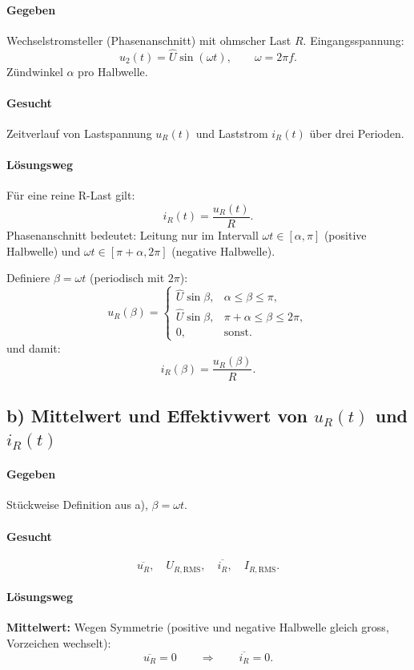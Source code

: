 \paragraph{Gegeben}
Wechselstromsteller (Phasenanschnitt) mit ohmscher Last $R$.
Eingangsspannung:
\[
u_2(t)=\hat U \sin(\omega t),\qquad \omega=2\pi f.
\]
Zündwinkel $\alpha$ pro Halbwelle.

\paragraph{Gesucht}
Zeitverlauf von Lastspannung $u_R(t)$ und Laststrom $i_R(t)$ über drei Perioden.

\paragraph{Lösungsweg}
Für eine reine R-Last gilt:
\[
i_R(t)=\frac{u_R(t)}{R}.
\]
Phasenanschnitt bedeutet: Leitung nur im Intervall $\omega t\in[\alpha,\pi]$ (positive Halbwelle)
und $\omega t\in[\pi+\alpha,2\pi]$ (negative Halbwelle).

Definiere $\beta=\omega t$ (periodisch mit $2\pi$):
\[
u_R(\beta)=
\begin{cases}
\hat U \sin\beta, & \alpha \le \beta \le \pi,\\[4pt]
\hat U \sin\beta, & \pi+\alpha \le \beta \le 2\pi,\\[4pt]
0, & \text{sonst.}
\end{cases}
\]
und damit:
\[
i_R(\beta)=\frac{u_R(\beta)}{R}.
\]


\subsection*{b) Mittelwert und Effektivwert von $u_R(t)$ und $i_R(t)$}

\paragraph{Gegeben}
Stückweise Definition aus a), $\beta=\omega t$.

\paragraph{Gesucht}
\[
\overline{u_R},\quad U_{R,\mathrm{RMS}},\quad \overline{i_R},\quad I_{R,\mathrm{RMS}}.
\]

\paragraph{Lösungsweg}
\textbf{Mittelwert:}
Wegen Symmetrie (positive und negative Halbwelle gleich gross, Vorzeichen wechselt):
\[
\boxed{\overline{u_R}=0}
\qquad\Rightarrow\qquad
\boxed{\overline{i_R}=0}.
\]

